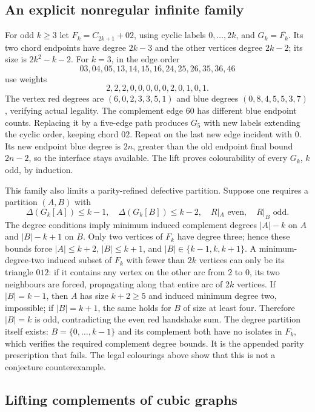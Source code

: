 \subsection{An explicit nonregular infinite family}

For odd $k\ge3$ let
$F_k=C_{2k+1}+02$, using cyclic labels $0,\ldots,2k$, and
$G_k=\overline{F_k}$. Its two chord endpoints have degree $2k-3$
and the other vertices degree $2k-2$; its size is $2k^2-k-2$.
For $k=3$, in the edge order
\[
 03,04,05,13,14,15,16,24,25,26,35,36,46
\]
use weights
\[
 2,2,2,0,0,0,0,0,2,0,1,0,1.
\]
The vertex red degrees are $(6,0,2,3,3,5,1)$ and blue degrees
$(0,8,4,5,5,3,7)$, verifying actual legality. The complement edge
$60$ has different blue endpoint counts. Replacing it by a
five-edge path produces $G_5$ with new labels extending the cyclic
order, keeping chord $02$. Repeat on the last new edge incident
with 0. Its new endpoint blue degree is $2n$, greater than the old
endpoint final bound $2n-2$, so the interface stays available.
The lift proves colourability of every $G_k$, $k$ odd, by induction.

This family also limits a parity-refined defective partition. Suppose
one requires a partition $(A,B)$ with
\[
 \Delta(G_k[A])\le k-1,\quad \Delta(G_k[B])\le k-2,
 \quad R|_A\text{ even},\quad R|_B\text{ odd}.
\]
The degree conditions imply minimum induced complement degrees
$|A|-k$ on $A$ and $|B|-k+1$ on $B$.
Only two vertices of $F_k$ have degree three; hence these bounds
force $|A|\le k+2$, $|B|\le k+1$, and
$|B|\in\{k-1,k,k+1\}$. A minimum-degree-two induced subset of
$F_k$ with fewer than $2k$ vertices can only be its triangle $012$:
if it contains any vertex on the other arc from 2 to 0, its two
neighbours are forced, propagating along that entire arc of $2k$
vertices. If $|B|=k-1$, then $A$ has size $k+2\ge5$ and induced
minimum degree two, impossible; if $|B|=k+1$, the same holds for
$B$ of size at least four. Therefore $|B|=k$ is odd, contradicting
the even red handshake sum. The degree partition itself exists:
$B=\{0,\ldots,k-1\}$ and its complement both have no isolates in
$F_k$, which verifies the required complement degree bounds. It is
the appended parity prescription that fails. The legal colourings
above show that this is not a conjecture counterexample.

\subsection{Lifting complements of cubic graphs}

